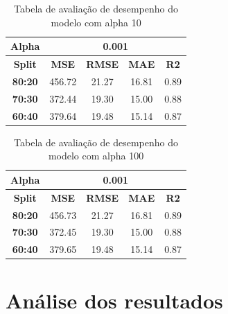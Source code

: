 \begin{table}[H]
\centering
\begin{tabular}{|c|c|c|c|c|}
\hline
\textbf{Alpha} & \multicolumn{4}{|c|}{\textbf{0.001}} \\
\hline
\textbf{Split} & \textbf{MSE} & \textbf{RMSE} & \textbf{MAE} & \textbf{R2} \\
\hline
\textbf{80:20} & 456.72 & 21.27 & 16.81 & 0.89 \\
\textbf{70:30} & 372.44 & 19.30 & 15.00 & 0.88 \\
\textbf{60:40} & 379.64 & 19.48 & 15.14 & 0.87 \\
\hline
\end{tabular}
\caption{Tabela de avaliação de desempenho do modelo com alpha 10}
\end{table}

\begin{table}[H]
\centering
\begin{tabular}{|c|c|c|c|c|}
\hline
\textbf{Alpha} & \multicolumn{4}{|c|}{\textbf{0.001}} \\
\hline
\textbf{Split} & \textbf{MSE} & \textbf{RMSE} & \textbf{MAE} & \textbf{R2} \\
\hline
\textbf{80:20} & 456.73 & 21.27 & 16.81 & 0.89 \\
\textbf{70:30} & 372.45 & 19.30 & 15.00 & 0.88 \\
\textbf{60:40} & 379.65 & 19.48 & 15.14 & 0.87 \\
\hline
\end{tabular}
\caption{Tabela de avaliação de desempenho do modelo com alpha 100}
\end{table}


\section{Análise dos resultados}


